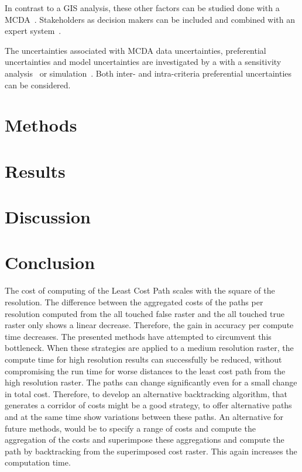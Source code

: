 \documentclass[acmtog]{acmart}
\begin{document}
	In contrast to a GIS analysis, these other factors can be studied done with a \acrfull{MCDA}~\cite{bertsch_participatory_2016}.
	Stakeholders as decision makers can be included and combined with an expert system~\cite{bertsch_participatory_2016}.
	
	The uncertainties associated with \acrshort{MCDA} data uncertainties, preferential uncertainties and model uncertainties are investigated by a with a sensitivity analysis~\cite{bertsch_participatory_2016} or simulation~\cite{butler_simulation_1997}.
	Both inter- and intra-criteria preferential uncertainties~\cite{bertsch_sensitivity_2007} can be considered.
	
	\section{Methods}\label{sec:methods}
	

	\section{Results}\label{sec:results}
	
	
	\section{Discussion}\label{sec:discussion}
	
		
	\section{Conclusion}\label{sec:conclusion}
	The cost of computing of the Least Cost Path scales with the square of the resolution.
	The difference between the aggregated costs of the paths per resolution computed from the all touched false raster and the all touched true raster only shows a linear decrease.
	Therefore, the gain in accuracy per compute time decreases.
	The presented methods have attempted to circumvent this bottleneck.
	When these strategies are applied to a medium resolution raster, the compute time for high resolution results can successfully be reduced, without compromising the run time for worse distances to the least cost path from the high resolution raster.
	The paths can change significantly even for a small change in total cost.
	Therefore, to develop an alternative backtracking algorithm, that generates a corridor of costs might be a good strategy, to offer alternative paths and at the same time show variations between these paths.
	An alternative for future methods, would be to specify a range of costs and compute the aggregation of the costs and superimpose these aggregations and compute the path by backtracking from the superimposed cost raster. 
	This again increases the computation time.
	
\end{document}
